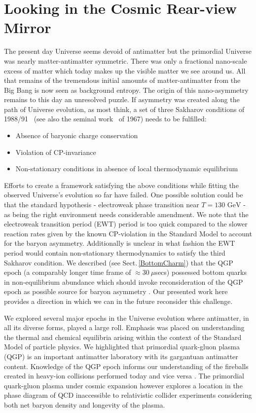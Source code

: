 \documentclass[universe,article,submit,moreauthors,pdftex,a4paper]{Definitions/mdpi}
\newcommand{\GeV}{\text{ GeV}}
\newcommand*{\rsec}[1]{Sect.\,{\ref{#1}}}
\begin{document}
\section{Looking in the Cosmic Rear-view Mirror}\label{Summary}
\noindent The present day Universe seems devoid of antimatter but the primordial Universe was nearly matter-antimatter symmetric. There was only a fractional nano-scale excess of matter which today makes up the visible matter we see around us. All that remains of the tremendous initial amounts of matter-antimatter from the Big Bang is now seen as background entropy. The origin of this nano-asymmetry remains to this day an unresolved puzzle. If asymmetry was created along the path of Universe evolution, as most think, a set of three Sakharov conditions of 1988/91~\cite{Sakharov:1988vdp} (see also the seminal work~\cite{Sakharov:1967dj} of 1967) needs to be fulfilled:
\begin{itemize}
    \item Absence of baryonic charge conservation 
    \item Violation of CP-invariance
    \item Non-stationary conditions in absence of local thermodynamic equilibrium
\end{itemize}
Efforts to create a framework satisfying the above conditions while fitting the observed Universe's evolution so far have failed. One possible solution could be that the standard hypothesis - electroweak phase transition near $T=130\GeV$ - as being the right environment needs considerable amendment. We note that the electroweak transition period (EWT) period is too quick compared to the slower reaction rates given by the known CP-violation in the Standard Model to account for the baryon asymmetry. Additionally is unclear in what fashion the EWT period would contain non-stationary thermodynamics to satisfy the third Sakharov condition. We described (see \rsec{BottomCharm}) that the QGP epoch (a comparably longer time frame of $\approx30\ \mu$secs) possessed bottom quarks in non-equilibrium abundance which should invoke reconsideration of the QGP epoch as possible source for baryon asymmetry \cite{Yang:2020nne,Yang:2023bot}. Our presented work here provides a direction in which we can in the future reconsider this challenge.

We explored several major epochs in the Universe evolution where antimatter, in all its diverse forms, played a large roll. Emphasis was placed on understanding the thermal and chemical equilibria arising within the context of the Standard Model of particle physics. We highlighted that primordial quark-gluon plasma (QGP) is an important antimatter laboratory with its gargantuan antimatter content. Knowledge of the QGP epoch informs our understanding of the fireballs created in heavy-ion collisions performed today and vice versa \cite{Rafelski:2013qeu,Petran:2013lja,Philipsen:2012nu}. The primordial quark-gluon plasma under cosmic expansion however explores a location in the phase diagram of QCD inaccessible to relativistic collider experiments considering both net baryon density and longevity of the plasma.
\end{document}
